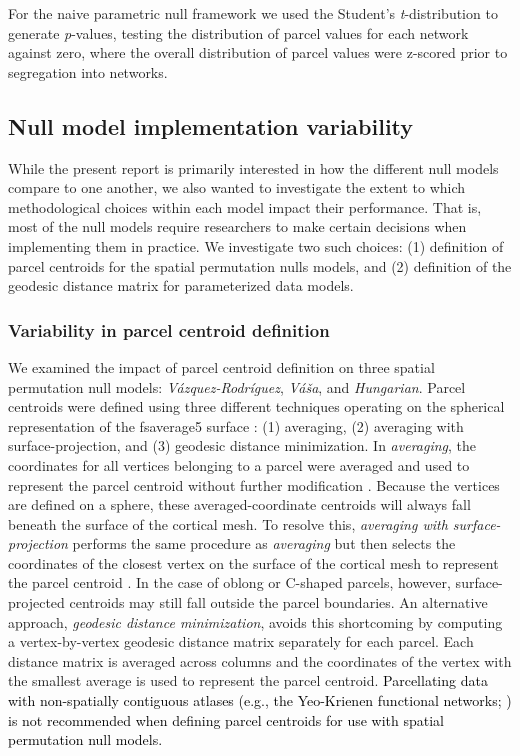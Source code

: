 \documentclass[12pt,aps,pra,reprint,showkeys]{revtex4-1}
\newcommand{\nimg}[1]{\textcolor{black}{{#1}}}
\begin{document}
For the naive parametric null framework we used the Student's \emph{t}-distribution to generate \emph{p}-values, testing the distribution of parcel values for each network against zero, where the overall distribution of parcel values were z-scored prior to segregation into networks.

\subsection*{Null model implementation variability}

While the present report is primarily interested in how the different null models compare to one another, we also wanted to investigate the extent to which methodological choices within each model impact their performance.
That is, most of the null models require researchers to make certain decisions when implementing them in practice.
We investigate two such choices: (1) definition of parcel centroids for the spatial permutation nulls models, and (2) definition of the geodesic distance matrix for parameterized data models.

\subsubsection*{Variability in parcel centroid definition}

We examined the impact of parcel centroid definition on three spatial permutation null models: \textit{V{\'a}zquez-Rodr{\'i}guez}, \textit{V{\'a}{\v{s}}a}, and \textit{Hungarian}.
Parcel centroids were defined using three different techniques operating on the spherical representation of the fsaverage5 surface \citep{fischl1999humanbrainmap}: (1) averaging, (2) averaging with surface-projection, and (3) geodesic distance minimization.
In \textit{averaging}, the coordinates for all vertices belonging to a parcel were averaged and used to represent the parcel centroid without further modification \citep{vasa2018cercor}.
Because the vertices are defined on a sphere, these averaged-coordinate centroids will always fall beneath the surface of the cortical mesh.
To resolve this, \textit{averaging with surface-projection} performs the same procedure as \textit{averaging} but then selects the coordinates of the closest vertex on the surface of the cortical mesh to represent the parcel centroid \citep{vazquezrodriguez2019pnas}.
In the case of oblong or C-shaped parcels, however, surface-projected centroids may still fall outside the parcel boundaries.
An alternative approach, \textit{geodesic distance minimization}, avoids this shortcoming by computing a vertex-by-vertex geodesic distance matrix separately for each parcel.
Each distance matrix is averaged across columns and the coordinates of the vertex with the smallest average is used to represent the parcel centroid.
\nimg{Parcellating data with non-spatially contiguous atlases (e.g., the Yeo-Krienen functional networks; \citealt{yeo2011organization}) is not recommended when defining parcel centroids for use with spatial permutation null models.}
\end{document}
